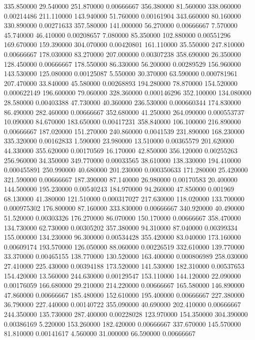 335.850000	29.540000	251.870000	0.00666667
356.380000	81.560000	338.060000	0.00214486
211.110000	143.940000	51.760000	0.00161904
343.660000	80.160000	330.890000	0.00271633
357.580000	141.000000	56.270000	0.00666667
7.570000	45.740000	46.410000	0.00208657
7.080000	85.350000	102.880000	0.00551296
169.670000	159.390000	304.070000	0.00420801
161.110000	35.550000	247.810000	0.00666667
178.030000	83.270000	207.000000	0.00307238
358.690000	26.350000	128.450000	0.00666667
178.550000	86.330000	56.200000	0.00289529
156.960000	143.530000	125.080000	0.00125087
5.550000	30.370000	63.590000	0.000781961
207.470000	33.840000	45.580000	0.00268893
194.280000	78.870000	154.520000	0.000622149
196.600000	79.060000	328.360000	0.000146296
352.100000	134.080000	28.580000	0.00403388
47.730000	40.360000	236.530000	0.000660344
174.830000	86.490000	282.460000	0.00666667
352.680000	41.250000	264.090000	0.000553737
10.090000	84.670000	183.650000	0.00417231
358.840000	106.100000	216.890000	0.00666667
187.020000	151.270000	240.860000	0.0041539
231.890000	168.230000	335.320000	0.00162833
1.590000	23.980000	13.510000	0.00365579
201.620000	44.330000	355.620000	0.00170569
16.170000	42.850000	356.120000	0.00255263
256.960000	34.350000	349.770000	0.00033565
38.610000	138.330000	194.410000	0.000455891
250.990000	40.680000	201.230000	0.000350633
171.280000	25.420000	321.590000	0.00666667
187.390000	87.140000	26.980000	0.00170583
20.400000	144.500000	195.230000	0.00540243
184.970000	94.260000	47.850000	0.001969
68.130000	41.380000	121.510000	0.000317027
217.630000	118.020000	133.700000	0.000975302
176.800000	87.160000	333.830000	0.00666667
340.920000	40.490000	51.520000	0.00303326
176.270000	86.070000	150.170000	0.00666667
358.470000	134.730000	62.730000	0.00305202
357.380000	94.310000	87.040000	0.00399334
155.000000	134.230000	96.300000	0.00534428
355.420000	83.040000	173.160000	0.00609174
193.570000	126.050000	88.060000	0.00226519
332.610000	139.770000	33.370000	0.00465155
138.770000	130.520000	163.400000	0.000806989
258.030000	27.410000	225.430000	0.00394188
173.520000	141.530000	182.310000	0.00537653
154.420000	13.560000	244.630000	0.00129547
153.110000	144.120000	22.090000	0.00176059
166.680000	29.210000	214.220000	0.00666667
165.580000	146.890000	47.860000	0.00666667
185.480000	152.610000	195.400000	0.00666667
227.380000	36.790000	227.440000	0.00140722
355.090000	40.690000	202.410000	0.00666667
244.350000	135.730000	287.400000	0.00228028
123.970000	154.350000	304.390000	0.00386169
5.220000	153.260000	182.420000	0.00666667
337.670000	145.570000	81.810000	0.00141617
4.560000	31.000000	66.590000	0.00666667
